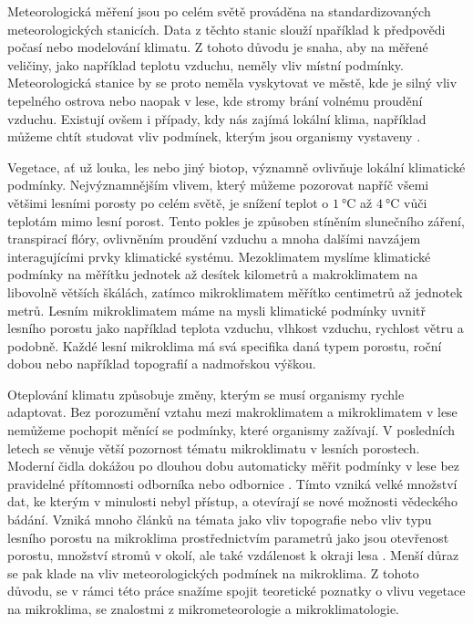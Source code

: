 Meteorologická měření jsou po celém světě prováděna na standardizovaných meteorologických stanicích. Data z těchto stanic slouží npaříklad k předpovědi počasí nebo modelování klimatu. Z tohoto důvodu je snaha, aby na měřené veličiny, jako například teplotu vzduchu, neměly vliv místní podmínky. Meteorologická stanice by se proto neměla vyskytovat ve městě, kde je silný vliv tepelného ostrova nebo naopak v lese, kde stromy brání volnému proudění vzduchu. Existují ovšem i případy, kdy nás zajímá lokální klima, například můžeme chtít studovat vliv podmínek, kterým jsou organismy vystaveny \parencite{ZellwegerFlorian2019Sdou}.

Vegetace, ať už louka, les nebo jiný biotop, významně ovlivňuje lokální klimatické podmínky. Nejvýznamnějším vlivem, který můžeme pozorovat napříč všemi většimi lesními porosty po celém světě, je snížení teplot o $\SI{1}{\celsius}$ až $\SI{4}{\celsius}$ vůči teplotám mimo lesní porost. Tento pokles je způsoben stíněním slunečního záření, transpirací flóry, ovlivněním proudění vzduchu a mnoha dalšími navzájem interagujícími prvky klimatické systému. Mezoklimatem myslíme klimatické podmínky na měřítku jednotek až desítek kilometrů a makroklimatem na libovolně větších škálách, zatímco mikroklimatem měřítko centimetrů až jednotek metrů. Lesním mikroklimatem máme na mysli klimatické podmínky uvnitř lesního porostu jako například teplota vzduchu, vlhkost vzduchu, rychlost větru a podobně. Každé lesní mikroklima má svá specifika daná typem porostu, roční dobou nebo například topografií a nadmořskou výškou.

Oteplování klimatu způsobuje změny, kterým se musí organismy rychle adaptovat. Bez porozumění vztahu mezi makroklimatem a mikroklimatem v lese nemůžeme pochopit měnící se podmínky, které organismy zažívají. V posledních letech se věnuje větší pozornost tématu mikroklimatu v lesních porostech. Moderní čidla dokážou po dlouhou dobu automaticky měřit podmínky v lese bez pravidelné přítomnosti odborníka nebo odbornice \parencite{WildJan2019Caer}. Tímto vzniká velké množství dat, ke kterým v minulosti nebyl přístup, a otevírají se nové možnosti vědeckého bádání. Vzniká mnoho článků na témata jako vliv topografie nebo vliv typu lesního porostu na mikroklima prostřednictvím parametrů jako jsou otevřenost porostu, množství stromů v okolí, ale také vzdálenost k okraji lesa \parencite{ZellwegerFlorian2019Sdou, predictingforestmicroclimate, snow_deFrenneForestMicroclimates, LindenmayerDavid2022Sard}. Menší důraz se pak klade na vliv meteorologických podmínek na mikroklima. Z tohoto důvodu, se v rámci této práce snažíme spojit teoretické poznatky o vlivu vegetace na mikroklima, se znalostmi z mikrometeorologie a mikroklimatologie.

